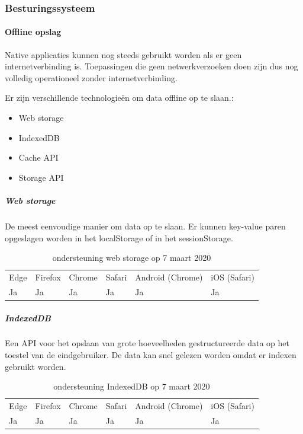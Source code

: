 	
	\subsubsection{Besturingssysteem}
	\paragraph{Offline opslag}
	Native applicaties kunnen nog steeds gebruikt worden als er geen internetverbinding is. Toepassingen die geen netwerkverzoeken doen zijn dus nog volledig operationeel zonder internetverbinding. 
	
	Er zijn verschillende technologieën om data offline op te slaan.:
	 \begin{itemize}
		\item	Web storage
		\item	IndexedDB
		\item	Cache API
		\item	Storage API
	\end{itemize}
	
		\subparagraph{Web storage}
		De meest eenvoudige manier om data op te slaan. Er kunnen key-value paren opgeslagen worden in het localStorage of in het sessionStorage. 
		\autocite{Hickson2016}
		
		\begin{table}[H]
			\centering
			\begin{tabular}{llllll}
				Edge & Firefox & Chrome & Safari & Android (Chrome) & iOS (Safari) \\
				Ja   & Ja      &  Ja     & Ja     & Ja               & Ja          
			\end{tabular}	
			\caption{ondersteuning web storage op 7 maart 2020}
		\end{table}
		
		
		
		\subparagraph{IndexedDB}
		Een API voor het opslaan van grote hoeveelheden gestructureerde data op het toestel van de eindgebruiker. De data kan snel gelezen worden omdat er indexen gebruikt worden. 
		\autocite{Alabbas2018}
		
		\begin{table}[H]
			\centering
				\begin{tabular}{llllll}
					Edge & Firefox & Chrome & Safari & Android (Chrome) & iOS (Safari) \\
					Ja   & Ja      &  Ja     & Ja     & Ja               & Ja          
				\end{tabular}	
				\caption{ondersteuning IndexedDB op 7 maart 2020}
		\end{table}
		
